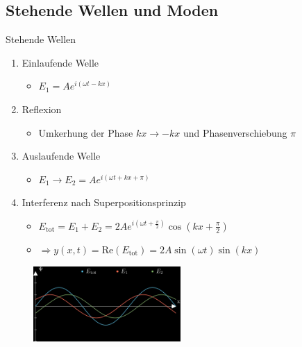 \documentclass{beamer}
\begin{document}
\subsection{Stehende Wellen und Moden}
\begin{frame}{Stehende Wellen}
	\begin{enumerate}
		\item Einlaufende Welle
		      \begin{itemize}
			      \item $E_1=A e^{i(\omega t - kx)}$
		      \end{itemize}
		\item Reflexion
		      \begin{itemize}
			      \item Umkerhung der Phase $kx \rightarrow -kx$ und Phasenverschiebung $\pi$
		      \end{itemize}
		\item Auslaufende Welle
		      \begin{itemize}
			      \item $E_1 \rightarrow E_2=A e^{i(\omega t + kx + \pi)}$
		      \end{itemize}
		\item Interferenz nach Superpositionsprinzip
		      \begin{itemize}
			      \item $E_{\text{tot}} = E_1 + E_2 = 2Ae^{i(\omega t+\frac{\pi}{2})}\cos{(kx+\frac{\pi}{2})}$
			      \item $\Rightarrow y(x,t)=\text{Re}(E_{\text{tot}})=2A\sin{(\omega t)}\sin{(kx)}$
		      \end{itemize}
	\end{enumerate}
	\begin{figure}
		\center\includegraphics[width=0.5\textwidth]{images/schwebung.png}
	\end{figure}
\end{frame}
\end{document}

